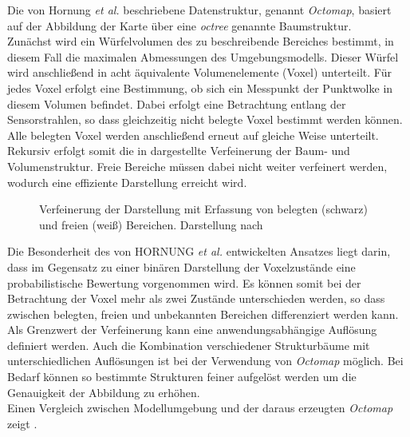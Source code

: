 Die von Hornung \textit{et al.} \cite{Hornung2013} beschriebene Datenstruktur, genannt \textit{Octomap}, basiert auf der Abbildung der Karte über eine \textit{octree} genannte Baumstruktur.\\
Zunächst wird ein Würfelvolumen des zu beschreibende Bereiches bestimmt, in diesem Fall die maximalen Abmessungen des Umgebungsmodells. Dieser Würfel wird anschließend in acht äquivalente Volumenelemente (Voxel) unterteilt. Für jedes Voxel erfolgt eine Bestimmung, ob sich ein Messpunkt der Punktwolke in diesem Volumen befindet. Dabei erfolgt eine Betrachtung entlang der Sensorstrahlen, so dass gleichzeitig nicht belegte Voxel bestimmt werden können. Alle belegten Voxel werden anschließend erneut auf gleiche Weise unterteilt. Rekursiv erfolgt somit die in  dargestellte Verfeinerung der Baum- und Volumenstruktur. Freie Bereiche müssen dabei nicht weiter verfeinert werden, wodurch eine effiziente Darstellung erreicht wird.\\

\begin{figure}[!ht]
	\begin{center}
	\hspace{5mm}
	\caption{Verfeinerung der \red[Octree] Darstellung mit Erfassung von belegten (schwarz) und freien (weiß) Bereichen. Darstellung nach \cite{Hornung2013} }
	\label{fig.octree}
	\end{center}
\end{figure}



Die Besonderheit des von HORNUNG \textit{et al.} entwickelten Ansatzes liegt darin, dass im Gegensatz zu einer binären Darstellung der Voxelzustände eine probabilistische Bewertung vorgenommen wird. Es können somit bei der Betrachtung der Voxel mehr als zwei Zustände unterschieden werden, so dass zwischen belegten, freien und unbekannten Bereichen differenziert werden kann. Als Grenzwert der Verfeinerung kann eine anwendungsabhängige Auflösung definiert werden. Auch die Kombination verschiedener Strukturbäume mit unterschiedlichen Auflösungen ist bei der Verwendung von \textit{Octomap} möglich. Bei Bedarf können so bestimmte Strukturen feiner aufgelöst werden um die Genauigkeit der Abbildung zu erhöhen.\\
Einen Vergleich zwischen Modellumgebung und der daraus erzeugten \textit{Octomap} zeigt .

